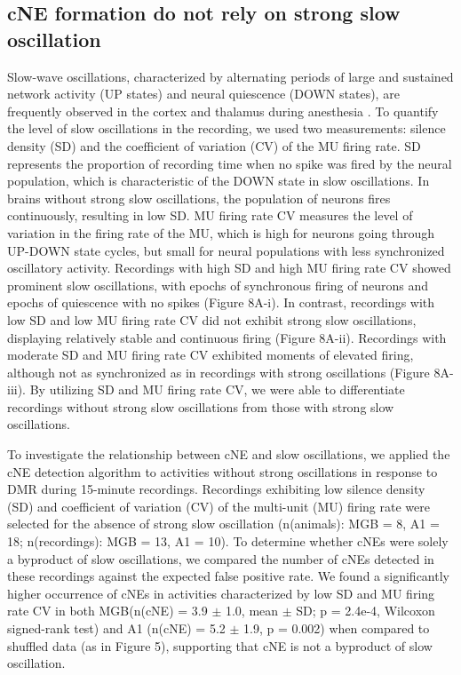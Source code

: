 \documentclass[11pt]{article}
\begin{document}
\subsection*{cNE formation do not rely on strong slow oscillation}
Slow-wave oscillations, characterized by alternating periods of large and sustained network activity (UP states) and neural quiescence (DOWN states), are frequently observed in the cortex and thalamus during anesthesia \citep{chauvette2011properties, contreras1996mechanisms, hasenstaub2007state, neske2016slow, sanchez2000cellular, steriade1993thalamocortical, steriade1993slow}. To quantify the level of slow oscillations in the recording, we used two measurements: silence density (SD) and the coefficient of variation (CV) of the MU firing rate. SD represents the proportion of recording time when no spike was fired by the neural population, which is characteristic of the DOWN state in slow oscillations. In brains without strong slow oscillations, the population of neurons fires continuously, resulting in low SD. MU firing rate CV measures the level of variation in the firing rate of the MU, which is high for neurons going through UP-DOWN state cycles, but small for neural populations with less synchronized oscillatory activity. Recordings with high SD and high MU firing rate CV showed prominent slow oscillations, with epochs of synchronous firing of neurons and epochs of quiescence with no spikes (Figure 8A-i). In contrast, recordings with low SD and low MU firing rate CV did not exhibit strong slow oscillations, displaying relatively stable and continuous firing (Figure 8A-ii). Recordings with moderate SD and MU firing rate CV exhibited moments of elevated firing, although not as synchronized as in recordings with strong oscillations (Figure 8A-iii). By utilizing SD and MU firing rate CV, we were able to differentiate recordings without strong slow oscillations from those with strong slow oscillations.

To investigate the relationship between cNE and slow oscillations, we applied the cNE detection algorithm to activities without strong oscillations in response to DMR during 15-minute recordings. Recordings exhibiting low silence density (SD) and coefficient of variation (CV) of the multi-unit (MU) firing rate were selected for the absence of strong slow oscillation (n(animals): MGB = 8, A1 = 18; n(recordings): MGB = 13, A1 = 10). To determine whether cNEs were solely a byproduct of slow oscillations, we compared the number of cNEs detected in these recordings against the expected false positive rate. We found a significantly higher occurrence of cNEs in activities characterized by low SD and MU firing rate CV in both MGB(n(cNE) = 3.9 $\pm$ 1.0, mean $\pm$ SD; p = 2.4e-4, Wilcoxon signed-rank test) and A1 (n(cNE) = 5.2 $\pm$ 1.9, p = 0.002) when compared to shuffled data (as in Figure 5), supporting that cNE is not a byproduct of slow oscillation.
\end{document}
